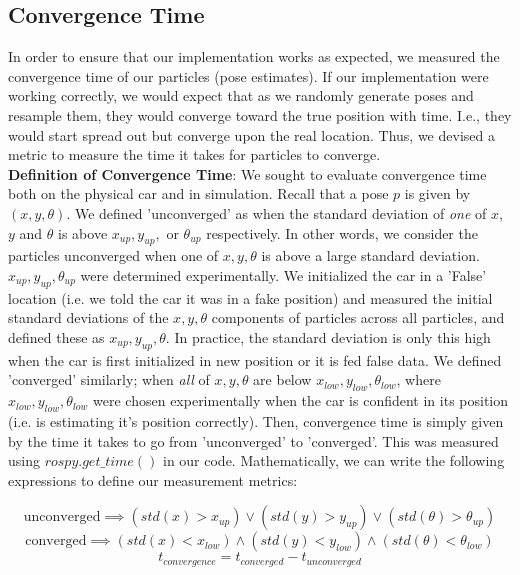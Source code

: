 \documentclass{article}
\begin{document}
\subsection{Convergence Time}

In order to ensure that our implementation works as expected, we measured the convergence time of our particles (pose estimates). If our implementation were working correctly, we would expect that as we randomly generate poses and resample them, they would converge toward the true position with time. I.e., they would start spread out but converge upon the real location. Thus, we devised a metric to measure the time it takes for particles to converge. \\

\textbf{Definition of Convergence Time}: We sought to evaluate convergence time both on the physical car and in simulation. Recall that a pose $p$ is given by $(x,y,\theta)$. We defined 'unconverged' as when the standard deviation of \textit{one} of $x$, $y$ and $\theta$ is above $x_{up},y_{up},\textrm{ or }\theta_{up}$ respectively. In other words, we consider the particles unconverged when one of $x,y,\theta$ is above a large standard deviation. $x_{up},y_{up},\theta_{up}$ were determined experimentally. We initialized the car in a 'False' location (i.e. we told the car it was in a fake position) and measured the initial standard deviations of the $x,y,\theta$ components of particles across all particles, and defined these as $x_{up},y_{up},\theta$. In practice, the standard deviation is only this high when the car is first initialized in new position or it is fed false data. We defined 'converged' similarly; when \textit{all} of $x,y,\theta$ are below $x_{low},y_{low},\theta_{low}$, where $x_{low},y_{low},\theta_{low}$ were chosen experimentally when the car is confident in its position (i.e. is estimating it's position correctly). Then, convergence time is simply given by the time it takes to go from 'unconverged' to 'converged'. This was measured using $rospy.get\_time()$ in our code. Mathematically, we can write the following expressions to define our measurement metrics: 

\begin{equation}
    \textrm{unconverged}\implies (std(x)>x_{up}) \vee (std(y)>y_{up})\vee (std(\theta)>\theta_{up})
\end{equation}
\begin{equation}
    \textrm{converged}\implies (std(x)<x_{low}) \wedge (std(y)<y_{low})\wedge (std(\theta)<\theta_{low})
\end{equation}
\begin{equation}
    t_{convergence} = t_{converged} - t_{unconverged}
\end{equation}
\end{document}
